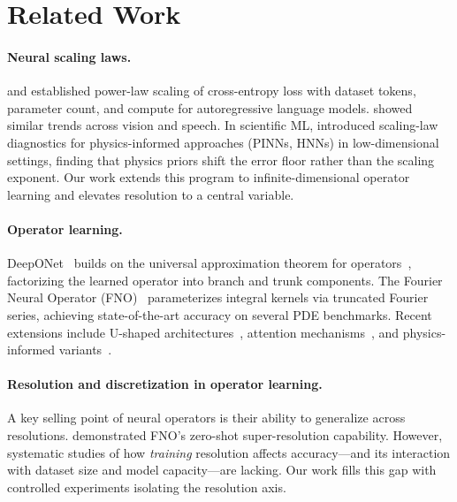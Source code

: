 \documentclass[11pt]{article}
\begin{document}
\section{Related Work}
\label{sec:related}

\paragraph{Neural scaling laws.}
\citet{kaplan2020scaling} and \citet{hoffmann2022training} established
power-law scaling of cross-entropy loss with dataset tokens, parameter
count, and compute for autoregressive language models.
\citet{hestness2017deep} showed similar trends across vision and speech.
In scientific ML, \citet{perrier2025scaling} introduced scaling-law
diagnostics for physics-informed approaches (PINNs, HNNs) in
low-dimensional settings, finding that physics priors shift the error
floor rather than the scaling exponent. Our work extends this program to
infinite-dimensional operator learning and elevates resolution to a
central variable.

\paragraph{Operator learning.}
DeepONet~\citep{lu2021learning} builds on the universal approximation
theorem for operators~\citep{chen1995universal}, factorizing the learned
operator into branch and trunk components. The Fourier Neural Operator
(FNO)~\citep{li2021fourier} parameterizes integral kernels via
truncated Fourier series, achieving state-of-the-art accuracy on
several PDE benchmarks. Recent extensions include U-shaped
architectures~\citep{wen2022ufno}, attention
mechanisms~\citep{hao2023gnot}, and physics-informed
variants~\citep{wang2021learning}.

\paragraph{Resolution and discretization in operator learning.}
A key selling point of neural operators is their ability to generalize
across resolutions. \citet{li2021fourier} demonstrated FNO's
zero-shot super-resolution capability. However, systematic studies of
how \emph{training} resolution affects accuracy---and its interaction
with dataset size and model capacity---are lacking. Our work fills this
gap with controlled experiments isolating the resolution axis.
\end{document}
